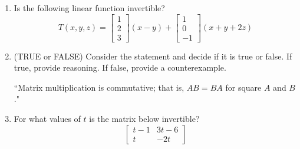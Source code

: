 \documentclass[14pt]{article}
\begin{document}
\begin{enumerate}
\item Is the following linear function invertible?
\[
T(x,y,z) = \left[\begin{array}{c}1\\2\\3\end{array}\right](x-y) + \left[\begin{array}{c}1\\0\\-1\end{array}\right](x+y+2z)
\]

\item (TRUE or FALSE) Consider the statement and decide if it is true or false.  If true, provide reasoning.  If false, provide a counterexample.
\begin{center}
``Matrix multiplication is commutative; that is, $ AB = BA $ for square $ A $ and $ B $."
\end{center}

\item For what values of $ t $ is the matrix below invertible?
\[
\left[\begin{array}{cc}
t-1 & 3t-6 \\ t & -2t
\end{array}\right]
\]




























\end{enumerate}
\end{document}
